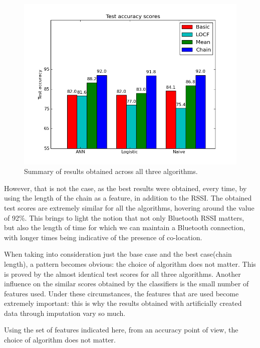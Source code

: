 \begin{figure}[h]
	\begin{center}
		\includegraphics[scale=0.6]{figures/total_tot.png}
	\end{center}
	
	\caption{Summary of results obtained across all three algorithms.}
	\label{pic:total_tot}

\end{figure}

However, that is not the case, as the best results were obtained, every time, by using the length of the chain as a feature, in addition to the RSSI. The obtained test scores are extremely similar for all the algorithms, hovering around the value of 92\%. This brings to light the notion that not only Bluetooth RSSI matters, but also the length of time for which we can maintain a Bluetooth connection, with longer times being indicative of the presence of co-location.  

When taking into consideration just the base case and the best case(chain length), a pattern becomes obvious: the choice of algorithm does not matter. This is proved by the almost identical test scores for all three algorithms. Another influence on the similar scores obtained by the classifiers is the small number of features used. Under these circumstances, the features that are used become extremely important: this is why the results obtained with artificially created data through imputation vary so much.

Using the set of features indicated here, from an accuracy point of view, the choice of algorithm does not matter. 


